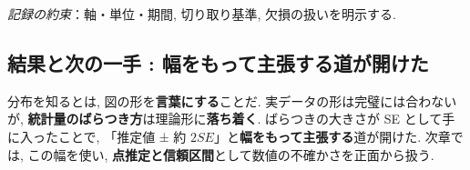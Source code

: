     \textit{記録の約束}：軸・単位・期間, 切り取り基準, 欠損の扱いを明示する.

  \subsection{結果と次の一手 : 幅をもって主張する道が開けた}
    分布を知るとは, 図の形を\textbf{言葉にする}ことだ.
    実データの形は完璧には合わないが, \textbf{統計量のばらつき方}は理論形に\textbf{落ち着く}.
    ばらつきの大きさが SE として手に入ったことで, 「推定値 ± 約 $2SE$」と\textbf{幅をもって主張する}道が開けた.
    次章では, この幅を使い, \textbf{点推定と信頼区間}として数値の不確かさを正面から扱う.
